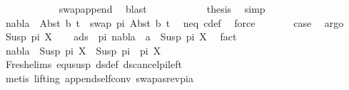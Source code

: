 \begin{isabellebody}
\ \ \ \ \ \ \ \ \ \ \isamarkupfalse%
\ swap{\isacharunderscore}{\kern0pt}append\ \isamarkupfalse%
\ blast\isanewline
\ \ \ \ \ \ \ \ \isamarkupfalse%
\ \isamarkupfalse%
\ {\isacharquery}{\kern0pt}thesis\ \isamarkupfalse%
\ simp\isanewline
\ \ \ \ \ \ \isamarkupfalse%
\isanewline
\ \ \ \ \isamarkupfalse%
\isanewline
\ \ \ \isamarkupfalse%
\ \isamarkupfalse%
\ {\isachardoublequoteopen}nabla\ {\isasymturnstile}\ Abst\ b\ t{\isacharprime}{\kern0pt}\ {\isasymapprox}\ swap\ pi\ {\isacharparenleft}{\kern0pt}Abst\ b\ t{\isacharprime}{\kern0pt}{\isacharparenright}{\kern0pt}{\isachardoublequoteclose}\ \isamarkupfalse%
\ neq\ c{\isacharunderscore}{\kern0pt}def\ \isamarkupfalse%
\ force\isanewline
\ \isacommand{{\isacharbraceright}{\kern0pt}}\isamarkupfalse%
\isanewline
\isanewline
\ \ \isamarkupfalse%
\ \isamarkupfalse%
\ {\isacharquery}{\kern0pt}case\ \isamarkupfalse%
\ argo\isanewline
\isanewline
{}\isamarkupfalse%
\isanewline
\ \ \isamarkupfalse%
\ {\isacharparenleft}{\kern0pt}Susp\ pi{\isacharprime}{\kern0pt}\ X{\isacharparenright}{\kern0pt}\isanewline
\ \ \isamarkupfalse%
\ {\isachardoublequoteopen}{\isasymforall}a{\isasymin}ds\ {\isacharbrackleft}{\kern0pt}{\isacharbrackright}{\kern0pt}\ pi{\isachardot}{\kern0pt}\ nabla\ {\isasymturnstile}\ a\ {\isasymsharp}\ Susp\ pi{\isacharprime}{\kern0pt}\ X{\isachardoublequoteclose}\ \isamarkupfalse%
\ fact\isanewline
\ \ \isamarkupfalse%
\ \isamarkupfalse%
\ {\isachardoublequoteopen}nabla\ {\isasymturnstile}\ Susp\ pi{\isacharprime}{\kern0pt}\ X\ {\isasymapprox}\ Susp\ {\isacharparenleft}{\kern0pt}pi\ {\isacharat}{\kern0pt}\ pi{\isacharprime}{\kern0pt}{\isacharparenright}{\kern0pt}\ X{\isachardoublequoteclose}\isanewline
\ \ \ \isamarkupfalse%
\ Fresh{\isacharunderscore}{\kern0pt}elims{\isacharparenleft}{\kern0pt}{}{\isacharparenright}{\kern0pt}\ equ{\isacharunderscore}{\kern0pt}susp\ ds{\isacharunderscore}{\kern0pt}def\ ds{\isacharunderscore}{\kern0pt}cancel{\isacharunderscore}{\kern0pt}pi{\isacharunderscore}{\kern0pt}left\isanewline
\ \ \ \isamarkupfalse%
\ {\isacharparenleft}{\kern0pt}metis\ {\isacharparenleft}{\kern0pt}lifting{\isacharparenright}{\kern0pt}\ append{\isacharunderscore}{\kern0pt}self{\isacharunderscore}{\kern0pt}conv{}\ swapas{\isacharunderscore}{\kern0pt}rev{\isacharunderscore}{\kern0pt}pi{\isacharunderscore}{\kern0pt}a{\isacharparenright}{\kern0pt}\isanewline

\end{isabellebody}
